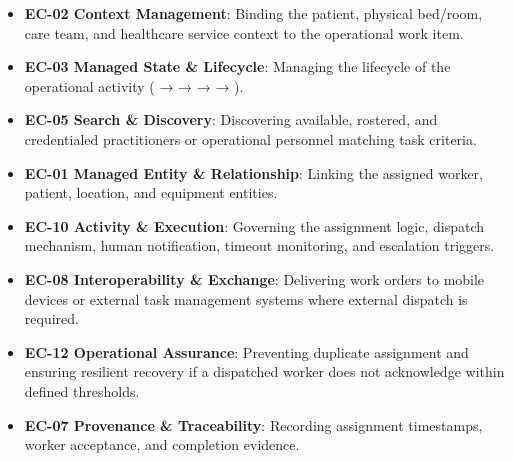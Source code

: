 \begin{itemize}
\begin{itemize}

\item
\textbf{EC-02 Context Management}: Binding the patient, physical bed/\allowbreak{}room, care team, and healthcare service context to the operational work item.



\item
\textbf{EC-03 Managed State \& Lifecycle}: Managing the lifecycle of the operational activity (\texttt{} → \texttt{} → \texttt{} → \texttt{} → \texttt{}).



\item
\textbf{EC-05 Search \& Discovery}: Discovering available, rostered, and credentialed practitioners or operational personnel matching task criteria.



\item
\textbf{EC-01 Managed Entity \& Relationship}: Linking the assigned worker, patient, location, and equipment entities.



\item
\textbf{EC-10 Activity \& Execution}: Governing the assignment logic, dispatch mechanism, human notification, timeout monitoring, and escalation triggers.



\item
\textbf{EC-08 Interoperability \& Exchange}: Delivering work orders to mobile devices or external task management systems where external dispatch is required.



\item
\textbf{EC-12 Operational Assurance}: Preventing duplicate assignment and ensuring resilient recovery if a dispatched worker does not acknowledge within defined thresholds.



\item
\textbf{EC-07 Provenance \& Traceability}: Recording assignment timestamps, worker acceptance, and completion evidence.



\end{itemize}


\end{itemize}
\label{rad:tier-model:254}

